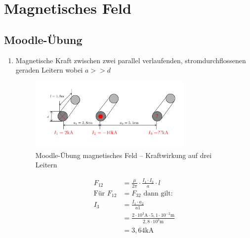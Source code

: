 \section{Magnetisches Feld}
\subsection{Moodle-Übung}
\begin{enumerate}
  \item Magnetische Kraft zwischen zwei parallel verlaufenden, stromdurchflossenen geraden Leitern wobei $a >> d$
        \begin{figure}[h!]
          \begin{center}
            \includegraphics[width=0.75\textwidth]{img/Magnetisches-Feld/A1.png}
          \end{center}
          \caption{Moodle-Übung magnetisches Feld – Kraftwirkung auf drei Leitern}
        \end{figure}

        \begin{align*}
          F_{12}             & = \frac{\mu}{2\pi}\cdot \frac{I_1\cdot I_2}{a}\cdot l                                 \\
          \text{Für } F_{12} & = F_{32} \text{ dann gilt:}                                                           \\
          I_3                & = \frac{I_1\cdot a_2}{a1}                                                             \\
                             & = \frac{2\cdot 10^{3}\text{A}\cdot 5,1\cdot 10^{-2}\text{m}}{2,8\cdot 10^{3}\text{m}} \\
                             & = 3,64\text{kA}                                                                       \\                                                                   \\
        \end{align*}


\end{enumerate}
